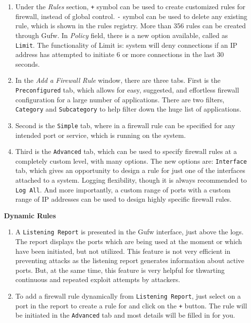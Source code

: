 \documentclass[12pt]{extarticle}
\begin{document}
\begin{enumerate}

\item Under the \textit{Rules} section, \texttt{+} symbol can be used to create customized rules for firewall, instead of global control. \texttt{-} symbol can be used to delete any existing rule, which is shown in the rules registry. More than 356 rules can be created through Gufw. In \textit{Policy} field, there is a new option available, called as \texttt{Limit}. The functionality of Limit is: system will deny connections if an IP address has attempted to initiate 6 or more connections in the last 30 seconds. 

\item In the \textit{Add a Firewall Rule} window, there are three tabs. First is the \texttt{Preconfigured} tab, which allows for easy, suggested, and effortless firewall configuration for a large number of applications. There are two filters, \texttt{Category} and \texttt{Subcategory} to help filter down the huge list of applications. 

\item Second is the \texttt{Simple} tab, where in a firewall rule can be specified for any intended port or service, which is running on the system. 

\item Third is the \texttt{Advanced} tab, which can be used to specify firewall rules at a completely custom level, with many options. The new options are: \texttt{Interface} tab, which gives an opportunity to design a rule for just one of the interfaces attached to a system. Logging flexibility, though it is always recommended to \texttt{Log All}. And more importantly, a custom range of ports with a custom range of IP addresses can be used to design highly specific firewall rules.

\end{enumerate}


\item \textbf{Dynamic Rules}

\begin{enumerate}

\item A \texttt{Listening Report} is presented in the Gufw interface, just above the logs. The report displays the ports which are being used at the moment or which have been initiated, but not utilized. This feature is not very efficient in preventing attacks as the listening report generates information about active ports. But, at the same time, this feature is very helpful for thwarting continuous and repeated exploit attempts by attackers. 

\item To add a firewall rule dynamically from \texttt{Listening Report}, just select on a port in the report to create a rule for and click on the \texttt{+} button. The rule will be initiated in the \texttt{Advanced} tab and most details will be filled in for you.
\end{enumerate}
\end{document}
